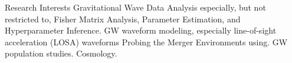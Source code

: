 
\begin{rubric}{Research Interests}
\entry*[] Gravitational Wave Data Analysis especially, but not restricted to, Fisher Matrix Analysis, Parameter Estimation, and Hyperparameter Inference.
\entry*[] GW waveform modeling, especially line-of-sight acceleration (LOSA) waveforms
\entry*[] Probing the Merger Environments using. 
\entry*[] GW population studies.
\entry*[] Cosmology.
    
\end{rubric}
